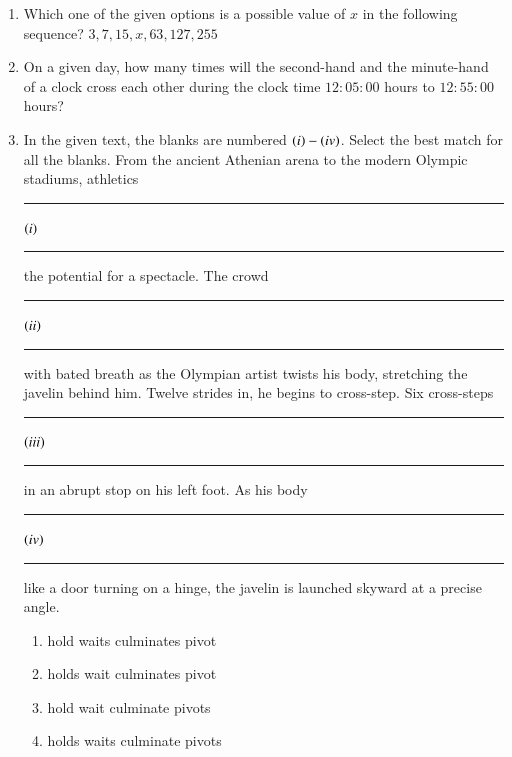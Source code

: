 \documentclass[journal,12pt,onecolumn]{IEEEtran}
\theoremstyle{remark}
\begin{document}
\begin{enumerate}
\item Which one of the given options is a possible value of $x$ in the following sequence?
$3, 7, 15,x,63, 127, 255$
\begin{enumerate}
\end{enumerate}
\hfill{}

\item On a given day, how many times will the second-hand and the minute-hand of a clock cross each other during the clock time $12\colon05\colon00$ hours to $12\colon55\colon00$ hours?
\begin{enumerate}
\end{enumerate}
\hfill{}

\item In the given text, the blanks are numbered $\left(i\right)-\left(iv\right)$. Select the best match for all the blanks.
From the ancient Athenian arena to the modern Olympic stadiums, athletics \rule{0.5cm}{0.15mm}$\left(i\right)$\rule{0.5cm}{0.15mm} the potential for a spectacle. The crowd \rule{0.5cm}{0.15mm}$\left(ii\right)$\rule{0.5cm}{0.15mm} with bated breath as the Olympian artist twists his body, stretching the javelin behind him. Twelve strides in, he begins to cross-step. Six cross-steps \rule{0.5cm}{0.15mm}$\left(iii\right)$\rule{0.5cm}{0.15mm} in an abrupt stop on his left foot. As his body \rule{0.5cm}{0.15mm}$\left(iv\right)$\rule{0.5cm}{0.15mm} like a door turning on a hinge, the javelin is launched skyward at a precise angle.
\begin{enumerate}
    \item {} hold  waits  culminates  pivot
    \item {} holds  wait  culminates  pivot
    \item {} hold  wait  culminate  pivots
    \item {} holds  waits  culminate  pivots
\end{enumerate}
\hfill{}


\end{enumerate}
\end{document}
